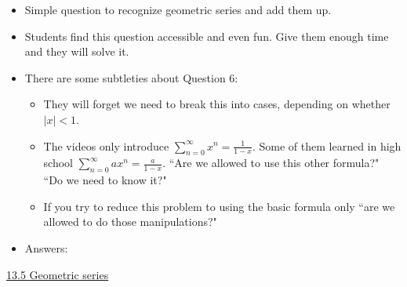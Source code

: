 \documentclass[11pt]{article}
\newcommand {\DS} [1] {${\displaystyle #1}$}
\newcommand{\nl}{\hfill \vspace{-1.1\baselineskip}} %
\newcommand{\vv}{\hspace{8mm} \href{https://www.youtube.com/watch?v=IjTJP3ssOkk&list=PLlwePzQY_wW-FJMnD_ybkXU_jZLVtZttI&index=5}{13.5 Geometric series} }
\begin{document}
\begin{comments}
\nl
	\begin{itemize}
		\item   Simple question to recognize geometric series and add them up.
		
		\item Students find this question accessible and even fun.  Give them enough time and they will solve it.

		\item  There are some subtleties about Question 6:
			\begin{itemize}
				\item They will forget we need to break this into cases, depending on whether $|x|<1$.
				\item  The videos only introduce \DS{\sum_{n=0}^{\infty} x^n = \frac{1}{1-x}}.  Some of them learned in high school  \DS{\sum_{n=0}^{\infty} ax^n = \frac{a}{1-x}}.  ``Are we allowed to use this other formula?"  ``Do we need to know it?"
				\item  If you try to reduce this problem to using the basic formula only ``are we allowed to do those manipulations?"
			\end{itemize}
		\item Answers: 
			\begin{itemize}
			\end{itemize}
	\end{itemize}
\end{comments}

\begin{videos}
\vv
\end{videos}
\end{document}
